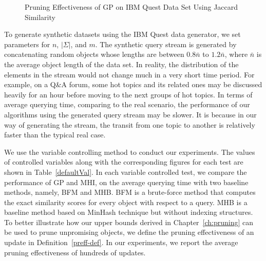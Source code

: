 \begin{figure}[htb]
\quad
{}
\quad
\raggedright
{}
\caption{Pruning Effectiveness of GP on IBM Quest Data Set Using Jaccard Similarity}
\label{ibmTestsP3}
\end{figure}


To generate synthetic datasets using the IBM Quest data generator, we set parameters for $n$, $|\Sigma|$, and $m$. The synthetic query stream is generated by concatenating random objects whose lengths are between $0.8\bar{n}$ to $1.2\bar{n}$, where $\bar{n}$ is the average object length of the data set. In reality, the distribution of the elements in the stream would not change much in a very short time period. For example, on a Q\&A forum, some hot topics and its related ones may be discussed heavily for an hour before moving to the next groups of hot topics. In terms of average querying time, comparing to the real scenario, the performance of our algorithms using the generated query stream may be slower. It is because in our way of generating the stream, the transit from one topic to another is relatively faster than the typical real case.

We use the variable controlling method to conduct our experiments. The values of controlled variables along with the corresponding figures for each test are shown in Table~\ref{defaultVal}. In each variable controlled test, we compare the performance of GP and MHI, on the average querying time with two baseline methods, namely, BFM and MHB. BFM is a brute-force method that computes the exact similarity scores for every object with respect to a query. MHB is a baseline method based on MinHash technique but without indexing structures. To better illustrate how our upper bounds derived in Chapter~\ref{ch:pruning} can be used to prune unpromising objects, we define the pruning effectiveness of an update in Definition~\ref{preff-def}. In our experiments, we report the average pruning effectiveness of hundreds of updates. 

